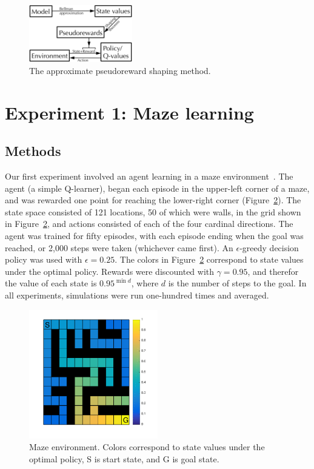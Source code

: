 \documentclass[letterpaper]{article}
\begin{document}
\begin{figure}[ht]
\centering
\includegraphics[width=0.4\textwidth]{approxPR_schematic}
\caption{The approximate pseudoreward shaping method.}
\label{fig:approxPR_schematic}
\end{figure}

\section{Experiment 1: Maze learning}

\subsection{Methods}

Our first experiment involved an agent learning in a maze environment~\cite{sutton1991dyna, sutton1991planning, peng1993efficient, sutton1998reinforcement, wiering2012reinforcement}. The agent (a simple Q-learner), began each episode in the upper-left corner of a maze, and was rewarded one point for reaching the lower-right corner (Figure~\ref{fig:maze_values}). The state space consisted of 121 locations, 50 of which were walls, in the grid shown in Figure~\ref{fig:maze_values}, and actions consisted of each of the four cardinal directions. The agent was trained for fifty episodes, with each episode ending when the goal was reached, or 2,000 steps were taken (whichever came first). An $\epsilon$-greedy decision policy was used with $\epsilon = 0.25$. The colors in Figure~\ref{fig:maze_values} correspond to state values under the optimal policy. Rewards were discounted with $\gamma = 0.95$, and therefor the value of each state is $0.95^{\min{d}}$, where $d$ is the number of steps to the goal. In all experiments, simulations were run one-hundred times and averaged.

\begin{figure}[ht]
\centering
\includegraphics[width=0.5\textwidth]{maze_values}
\caption{Maze environment. Colors correspond to state values under the optimal policy, S is start state, and G is goal state.}
\label{fig:maze_values}
\end{figure}
\end{document}
